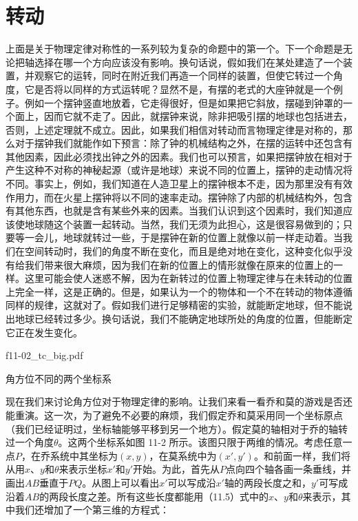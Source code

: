\documentclass[12pt,oneside]{book}
\begin{document}
\section{转动}
上面是关于物理定律对称性的一系列较为复杂的命题中的第一个。下一个命题是无论把轴选择在哪一个方向应该没有影响。换句话说，假如我们在某处建造了一个装置，并观察它的运转，同时在附近我们再造一个同样的装置，但使它转过一个角度，它是否将以同样的方式运转呢？显然不是，有摆的老式的大座钟就是一个例子。例如一个摆钟竖直地放着，它走得很好，但是如果把它斜放，摆碰到钟罩的一个面上，因而它就不走了。因此，就摆钟来说，除非把吸引摆的地球也包括进去，否则，上述定理就不成立。因此，如果我们相信对转动而言物理定律是对称的，那么对于摆钟我们就能作如下预言：除了钟的机械结构之外，在摆的运转中还包含有其他因素，因此必须找出钟之外的因素。我们也可以预言，如果把摆钟放在相对于产生这种不对称的神秘起源（或许是地球）来说不同的位置上，摆钟的走动情况将不同。事实上，例如，我们知道在人造卫星上的摆钟根本不走，因为那里没有有效作用力，而在火星上摆钟将以不同的速率走动。摆钟除了内部的机械结构外，包含有其他东西，也就是含有某些外来的因素。当我们认识到这个因素时，我们知道应该使地球随这个装置一起转动。当然，我们无须为此担心，这是很容易做到的；只要等一会儿，地球就转过一些，于是摆钟在新的位置上就像以前一样走动着。当我们在空间转动时，我们的角度不断在变化，而且是绝对地在变化，这种变化似乎没有给我们带来很大麻烦，因为我们在新的位置上的情形就像在原来的位置上的一样。这里可能会使人迷惑不解，因为在新转过的位置上物理定律与在未转动的位置上完全一样，这是正确的。但是，如果认为一个的物体和一个不在转动的物体遵循同样的规律，这就对了。假如我们进行足够精密的实验，就能断定地球，但不能说出地球已经转过多少。换句话说，我们不能确定地球所处的角度的位置，但能断定它正在发生变化。

\begin{fig}{f11-02_tc_big.pdf}
\caption{角方位不同的两个坐标系}
\label{fig:图11-2}
\end{fig}


现在我们来讨论角方位对于物理定律的影响。让我们来看一看乔和莫的游戏是否还能重演。这一次，为了避免不必要的麻烦，我们假定乔和莫采用同一个坐标原点（我们已经证明过，坐标轴能够平移到另一个地方）。假定莫的轴相对于乔的轴转过一个角度$\theta$。这两个坐标系如图 11-2 所示。该图只限于两维的情况。考虑任意一点$P$，在乔系统中其坐标为$(x, y)$，在莫系统中为$(x', y')$。和前面一样，我们将从用$x$、$y$和$\theta$来表示坐标$x'$和$y'$开始。为此，首先从$P$点向四个轴各画一条垂线，并画出$AB$垂直于$PQ$。从图上可以看出$x'$可以写成沿$x'$轴的两段长度之和，$y'$可写成沿着$AB$的两段长度之差。所有这些长度都能用（11.5）式中的$x$、$y$和$\theta$来表示，其中我们还增加了一个第三维的方程式：
\end{document}
